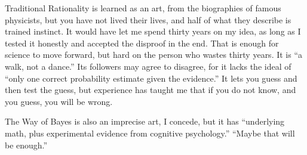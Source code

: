 Traditional Rationality is learned as an art, from the biographies of famous physicists, but you have not lived their lives, and half of what they describe is trained instinct.  It would have let me spend thirty years on my idea, as long as I tested it honestly and accepted the disproof in the end. That is enough for science to move forward, but hard on the person who wastes thirty years. It is ``a walk, not a dance.'' Its followers may agree to disagree, for it lacks the ideal of ``only one correct probability estimate given the evidence.'' It lets you guess and then test the guess, but experience has taught me that if you do not know, and you guess, you will be wrong. 

The Way of Bayes is also an imprecise art, I concede, but it has ``underlying math, plus experimental evidence from cognitive psychology.'' ``Maybe that will be enough.''
